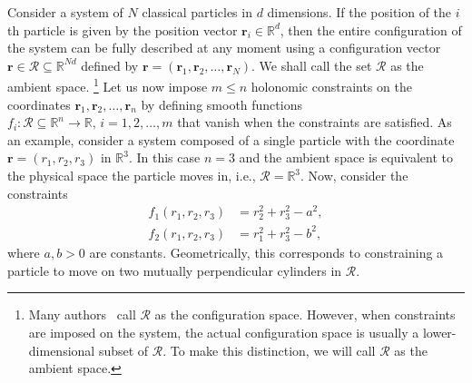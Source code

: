 Consider a system of $N$ classical particles in $d$ dimensions.  If the position of the $i$th particle is given by the position vector $\bm{r}_{i} \in \mathbb{R}^{d}$, then the entire configuration of the system can be fully described at any moment using a configuration vector $\bm{r} \in \mathscr{R} \subseteq \mathbb{R}^{Nd}$ defined by $\bm{r} = (\bm{r}_{1}, \bm{r}_{2}, \ldots, \bm{r}_{N})$.
  We shall call the set $\mathscr{R}$ as the ambient space.%
  \footnote{Many authors~\cite{littlejohn1997,lelievre2010} call $\mathscr{R}$ as the configuration space.  However, when constraints are imposed on the system, the actual configuration space is usually a lower-dimensional subset of $\mathscr{R}$.  To make this distinction, we will call $\mathscr{R}$ as the ambient space.}
Let us now impose $m \leq n$ holonomic constraints on the coordinates $\bm{r}_1, \bm{r}_2, \dots, \bm{r}_n$ by defining smooth functions $f_i: \mathscr{R} \subseteq \mathbb{R}^n \to \mathbb{R},\, i=1, 2, \dots, m$ that vanish when the constraints are satisfied.
As an example, consider a system composed of a single particle with the coordinate $\bm{r} = (r_{1}, r_{2}, r_{3})$ in $\mathbb{R}^3$.
In this case $n=3$ and the ambient space is equivalent to the physical space the particle moves in, i.e., $\mathscr{R} = \mathbb{R}^3$.
Now, consider the constraints
%
\begin{equation}
  \begin{aligned}
    f_1(r_{1}, r_{2}, r_{3}) &= r_{2}^{2} + r_{3}^{2} - a^{2},\\
    f_2(r_{1}, r_{2}, r_{3}) &= r_{1}^{2} + r_{3}^{2} - b^{2},
  \end{aligned}
  \label{eq:cylcyl}
\end{equation}
%
where $a, b > 0$ are constants.
Geometrically, this corresponds to constraining a particle to move on two mutually perpendicular cylinders in $\mathscr{R}$.

